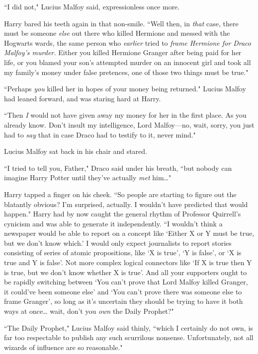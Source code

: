 ``I did not," Lucius Malfoy said, expressionless once more.

Harry bared his teeth again in that non-smile. ``Well then, in \emph{that} case, there must be someone \emph{else} out there who killed Hermione and messed with the Hogwarts wards, the same person who \emph{earlier} tried to \emph{frame Hermione for Draco Malfoy's murder.} Either you killed Hermione Granger after being paid for her life, or you blamed your son's attempted murder on an innocent girl and took all my family's money under false pretences, one of those two things must be true."

``Perhaps \emph{you} killed her in hopes of your money being returned." Lucius Malfoy had leaned forward, and was staring hard at Harry.

``Then \emph{I} would not have given away my money for her in the first place. As you already know. Don't insult my intelligence, Lord Malfoy—no, wait, sorry, you just had to \emph{say} that in case Draco had to testify to it, never mind."

Lucius Malfoy sat back in his chair and stared.

``I tried to tell you, Father," Draco said under his breath, ``but nobody can imagine Harry Potter until they've actually \emph{met} him{\ldots}"

Harry tapped a finger on his cheek. ``So people are starting to figure out the blatantly obvious? I'm surprised, actually. I wouldn't have predicted that would happen." Harry had by now caught the general rhythm of Professor Quirrell's cynicism and was able to generate it independently. ``I wouldn't think a newspaper would be able to report on a concept like `Either X or Y must be true, but we don't know which.' I would only expect journalists to report stories consisting of series of atomic propositions, like `X is true', `Y is false', or `X is true and Y is false'. Not more complex logical connectors like `If X is true then Y is true, but we don't know whether X is true'. And all your supporters ought to be rapidly switching between `You can't prove that Lord Malfoy killed Granger, it could've been someone else' and `You can't prove there was someone else to frame Granger', so long as it's uncertain they should be trying to have it both ways at once{\ldots} wait, don't you \emph{own} the Daily Prophet?"

``The Daily Prophet," Lucius Malfoy said thinly, ``which I certainly do not own, is far too respectable to publish any such scurrilous nonsense. Unfortunately, not all wizards of influence are so reasonable."

